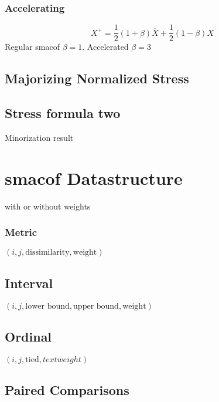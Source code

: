 \documentclass[
  12pt,
  letterpaper,
  DIV=11,
  numbers=noendperiod]{scrartcl}
\newcommand{\sectionbreak}{\clearpage}
\theoremstyle{plain}
\theoremstyle{remark}
\begin{document}
\subsubsection{Accelerating}\label{accelerating}

\[
X^+=\frac12(1+\beta)\overline{X}+\frac12(1-\beta)X
\] Regular smacof \(\beta = 1\). Accelerated \(\beta=3\)

\subsection{Majorizing Normalized
Stress}\label{majorizing-normalized-stress}

\subsection{Stress formula two}\label{stress-formula-two}

Minorization result

\sectionbreak

\section{smacof Datastructure}\label{smacof-datastructure}

with or without weights

\subsubsection{Metric}\label{metric}

\((i, j, \text{dissimilarity}, \text{weight})\)

\subsection{Interval}\label{interval}

\((i, j, \text{lower bound}, \text{upper bound}, \text{weight})\)

\subsection{Ordinal}\label{ordinal}

\((i, j, \text{tied}, text{weight})\)

\subsection{Paired Comparisons}\label{paired-comparisons}
\end{document}
